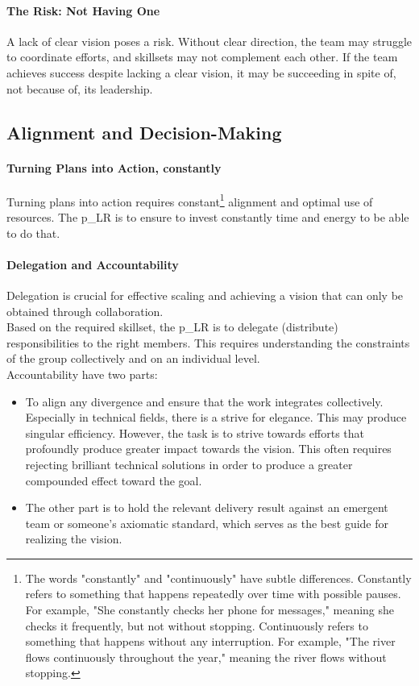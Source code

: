 \paragraph{The Risk: Not Having One}
A lack of clear vision poses a risk. Without clear direction, the team may struggle to coordinate efforts, and skillsets may not complement each other. If the team achieves success despite lacking a clear vision, it may be succeeding in spite of, not because of, its leadership.

\subsection{Alignment and Decision-Making} \label{responsibility__alignment}
\paragraph{Turning Plans into Action, constantly}
Turning plans into action requires constant\footnote{
	The words "constantly" and "continuously" have subtle differences. Constantly refers to something that happens repeatedly over time with possible pauses. For example, "She constantly checks her phone for messages," meaning she checks it frequently, but not without stopping. Continuously refers to something that happens without any interruption. For example, "The river flows continuously throughout the year," meaning the river flows without stopping.
}
alignment and optimal use of resources. The \gls{p_LR} is to ensure to invest constantly time and energy to be able to do that.

\paragraph{Delegation and Accountability}
Delegation is crucial for effective scaling and achieving a vision that can only be obtained through collaboration.\\

Based on the required skillset, the \gls{p_LR} is to delegate (distribute) responsibilities to the right members. This requires understanding the constraints of the group collectively and on an individual level.\\

Accountability have two parts: 
\begin{itemize}
	\item To align any divergence and ensure that the work integrates collectively. Especially in technical fields, there is a strive for elegance. This may produce singular efficiency. However, the task is to strive towards efforts that profoundly produce greater impact towards the vision. This often requires rejecting brilliant technical solutions in order to produce a greater compounded effect toward the goal.
	\item The other part is to hold the relevant delivery result against an emergent team or someone's axiomatic standard, which serves as the best guide for realizing the vision.
\end{itemize}

